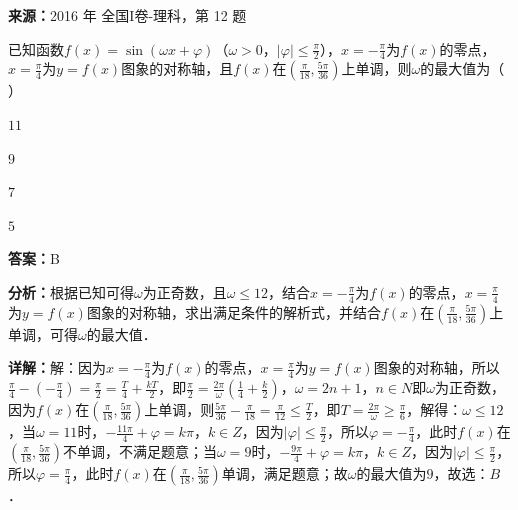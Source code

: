 \begin{question}[points=5]
\textbf{来源：}2016 年 全国I卷-理科，第 12 题\par
已知函数$f(x)=\sin(\omega x+\varphi)$（$\omega>0$，$|\varphi|\le\frac{\pi}{2}$），$x=-\frac{\pi}{4}$为$f(x)$的零点，$x=\frac{\pi}{4}$为$y=f(x)$图象的对称轴，且$f(x)$在$(\frac{\pi}{18},\frac{5\pi}{36})$上单调，则$\omega$的最大值为（ ）
\begin{choices}
  \item $11$
  \item $9$
  \item $7$
  \item $5$
\end{choices}
\begin{solution}
\textbf{答案：}B

\textbf{分析：}根据已知可得$\omega$为正奇数，且$\omega\le12$，结合$x=-\frac{\pi}{4}$为$f(x)$的零点，$x=\frac{\pi}{4}$为$y=f(x)$图象的对称轴，求出满足条件的解析式，并结合$f(x)$在$(\frac{\pi}{18},\frac{5\pi}{36})$上单调，可得$\omega$的最大值．

\textbf{详解：}解：因为$x=-\frac{\pi}{4}$为$f(x)$的零点，$x=\frac{\pi}{4}$为$y=f(x)$图象的对称轴，所以$\frac{\pi}{4}-(-\frac{\pi}{4})=\frac{\pi}{2}=\frac{T}{4}+\frac{kT}{2}$，即$\frac{\pi}{2}=\frac{2\pi}{\omega}(\frac{1}{4}+\frac{k}{2})$，$\omega=2n+1$，$n\in N$即$\omega$为正奇数，因为$f(x)$在$(\frac{\pi}{18},\frac{5\pi}{36})$上单调，则$\frac{5\pi}{36}-\frac{\pi}{18}=\frac{\pi}{12}\le\frac{T}{2}$，即$T=\frac{2\pi}{\omega}\ge\frac{\pi}{6}$，解得：$\omega\le12$，当$\omega=11$时，$-\frac{11\pi}{4}+\varphi=k\pi$，$k\in Z$，因为$|\varphi|\le\frac{\pi}{2}$，所以$\varphi=-\frac{\pi}{4}$，此时$f(x)$在$(\frac{\pi}{18},\frac{5\pi}{36})$不单调，不满足题意；当$\omega=9$时，$-\frac{9\pi}{4}+\varphi=k\pi$，$k\in Z$，因为$|\varphi|\le\frac{\pi}{2}$，所以$\varphi=\frac{\pi}{4}$，此时$f(x)$在$(\frac{\pi}{18},\frac{5\pi}{36})$单调，满足题意；故$\omega$的最大值为$9$，故选：$B$．
\end{solution}
\end{question}

